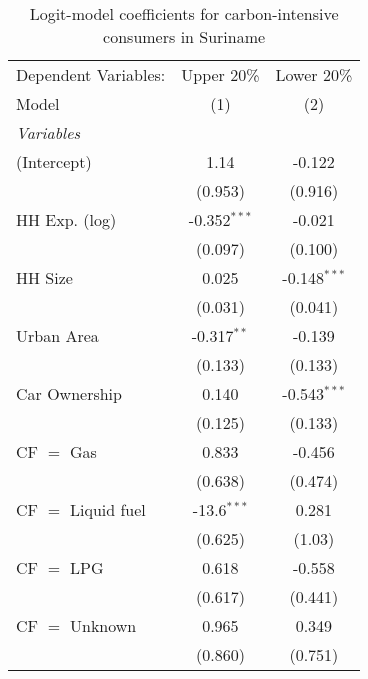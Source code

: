 
\begin{table}[htbp!]
   \centering
   \small
   \begin{adjustbox}{width = 1\textwidth, max height = 0.95\textheight, center}
      \begin{threeparttable}[b]
         \caption{\label{tab:Logit_1_SUR} Logit-model coefficients for carbon-intensive consumers in Suriname}
         \begin{tabular}{lcc}
            \tabularnewline \midrule \midrule
            Dependent Variables: & Upper 20\%     & Lower 20\%\\   
            Model                & (1)            & (2)\\  
            \midrule
            \emph{Variables}\\
            (Intercept)          & 1.14           & -0.122\\   
                                 & (0.953)        & (0.916)\\   
            HH Exp. (log)        & -0.352$^{***}$ & -0.021\\   
                                 & (0.097)        & (0.100)\\   
            HH Size              & 0.025          & -0.148$^{***}$\\   
                                 & (0.031)        & (0.041)\\   
            Urban Area           & -0.317$^{**}$  & -0.139\\   
                                 & (0.133)        & (0.133)\\   
            Car Ownership        & 0.140          & -0.543$^{***}$\\   
                                 & (0.125)        & (0.133)\\   
            CF $=$ Gas           & 0.833          & -0.456\\   
                                 & (0.638)        & (0.474)\\   
            CF $=$ Liquid fuel   & -13.6$^{***}$  & 0.281\\   
                                 & (0.625)        & (1.03)\\   
            CF $=$ LPG           & 0.618          & -0.558\\   
                                 & (0.617)        & (0.441)\\   
            CF $=$ Unknown       & 0.965          & 0.349\\   
                                 & (0.860)        & (0.751)\\   

\end{tabular}
\end{threeparttable}
\end{adjustbox}
\end{table}
